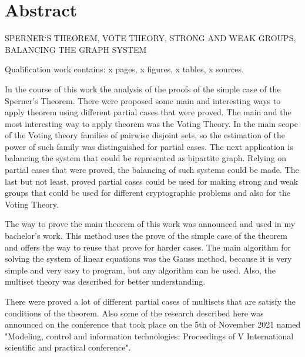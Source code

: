 \chapter*{Abstract}

\MakeUppercase{Sperner`s theorem, vote theory, strong and weak groups, balancing the graph system}

Qualification work contains: x pages, x figures, x tables, x sources.

	In the course of this work the analysis of the proofs of the simple case of the Sperner's Theorem. There were proposed some main and interesting ways to apply theorem using different partial cases that were proved. The main and the most interesting way to apply theorem was the Voting Theory. In the main scope of the Voting theory families of pairwise disjoint sets, so the estimation of the power of such family was distinguished for partial cases. The next application is balancing the system that could be represented as bipartite graph. Relying on partial cases that were proved, the balancing of such systems could be made. The last but not least, proved partial cases could be used for making strong and weak groups that could be used for different cryptographic problems and also for the Voting Theory.
	
	The way to prove the main theorem of this work was announced and used in my bachelor's work. This method uses the prove of the simple case of the theorem and offers the way to reuse that prove for harder cases. The main algorithm for solving the system of linear equations was the Gauss method, because it is very simple and very easy to program, but any algorithm can be used. Also, the multiset theory was described for better understanding. 

	There were proved a lot of different partial cases of multisets that are satisfy the conditions of the theorem. Also some of the research described here was announced on the conference that took place on the 5th of November 2021 named "Modeling, control and information technologies: Proceedings of V International scientific and practical conference".